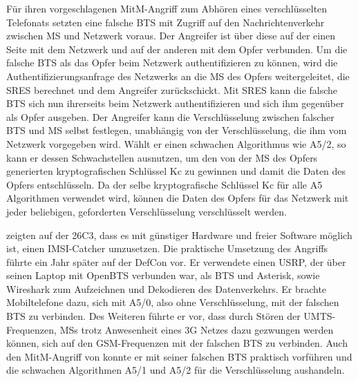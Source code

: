 Für ihren vorgeschlagenen \ac{MitM}-Angriff zum Abhören eines verschlüsselten Telefonats setzten \citet{barkan2003instant} eine falsche \ac{BTS} mit Zugriff auf den Nachrichtenverkehr zwischen \ac{MS} und Netzwerk voraus. Der Angreifer ist über diese auf der einen Seite mit dem Netzwerk und auf der anderen mit dem Opfer verbunden. Um die falsche \ac{BTS} als das Opfer beim Netzwerk authentifizieren zu können, wird die Authentifizierungsanfrage des Netzwerks an die \ac{MS} des Opfers weitergeleitet, die \ac{SRES} berechnet und dem Angreifer zurückschickt. Mit \ac{SRES} kann die falsche \ac{BTS} sich nun ihrerseits beim Netzwerk authentifizieren und sich ihm gegenüber als Opfer ausgeben. Der Angreifer kann die Verschlüsselung zwischen falscher \ac{BTS} und \ac{MS} selbst festlegen, unabhängig von der Verschlüsselung, die ihm vom Netzwerk vorgegeben wird. Wählt er einen schwachen Algorithmus wie A5/2, so kann er dessen Schwachstellen ausnutzen, um den von der \ac{MS} des Opfers generierten kryptografischen Schlüssel \ac{Kc} zu gewinnen und damit die Daten des Opfers entschlüsseln. Da der selbe kryptografische Schlüssel \ac{Kc} für alle \ac{A5} Algorithmen verwendet wird, können die Daten des Opfers für das Netzwerk mit jeder beliebigen, geforderten Verschlüsselung verschlüsselt werden.

\citet{nohl2009gsm} zeigten auf der 26C3, dass es mit günstiger Hardware und freier Software möglich ist, einen \ac{IMSI}-Catcher umzusetzen. Die praktische Umsetzung des Angriffs führte \citet{paget2010practical} ein Jahr später auf der DefCon vor. Er verwendete einen \ac{USRP}, der über seinen Laptop mit OpenBTS verbunden war, als \ac{BTS} und Asterisk, sowie Wireshark zum Aufzeichnen und Dekodieren des Datenverkehrs. Er brachte Mobiltelefone dazu, sich mit A5/0, also ohne Verschlüsselung, mit der falschen \ac{BTS} zu verbinden. Des Weiteren führte er vor, dass durch Stören der \ac{UMTS}-Frequenzen, \acp{MS} trotz Anwesenheit eines 3G Netzes dazu gezwungen werden können, sich auf den \ac{GSM}-Frequenzen mit der falschen \ac{BTS} zu verbinden. Auch den \ac{MitM}-Angriff von \citet{barkan2003instant} konnte er mit seiner falschen \ac{BTS} praktisch vorführen und die schwachen Algorithmen A5/1 und A5/2 für die Verschlüsselung aushandeln.

